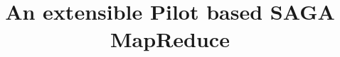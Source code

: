 \documentclass{acm_proc_article-sp}
\begin{document}
\title{An extensible Pilot based SAGA MapReduce}

%
%
%
%
%
\end{document}
